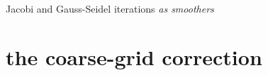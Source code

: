 \documentclass[10pt,
               svgnames,
               hyperref={colorlinks,citecolor=DeepPink4,linkcolor=FireBrick,urlcolor=Maroon},
               usepdftitle=false]{beamer}
\begin{document}
\begin{frame}{Jacobi and Gauss-Seidel iterations \emph{as smoothers}}
\begin{itemize}
\end{itemize}
\end{frame}


\section{the coarse-grid correction}
\end{document}
